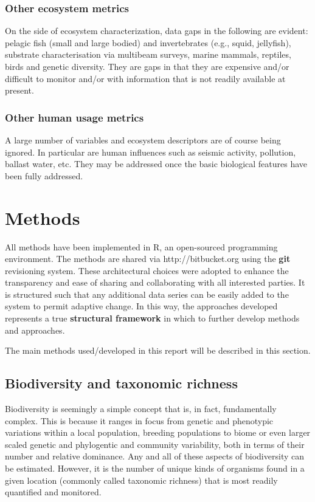 \documentclass[letterpaper,portrait,11pt]{scrartcl}
\numberwithin{equation}{section}    %
\numberwithin{figure}{section}    %
\numberwithin{table}{section}       %
\begin{document}
\subsubsection{Other ecosystem metrics}
On the side of ecosystem characterization, data gaps in the following are evident: pelagic fish (small and large bodied) and invertebrates (e.g., squid, jellyfish), substrate characterisation via multibeam surveys, marine mammals, reptiles, birds and genetic diversity. They are gaps in that they are expensive and/or difficult to monitor and/or with information that is not readily available at present.

\subsubsection{Other human usage metrics}
A large number of variables and ecosystem descriptors are of course being ignored. In particular are human influences such as seismic activity, pollution, ballast water, etc. They may be addressed once the basic biological features have been fully addressed. 


\afterpage{\clearpage}
\section{Methods}
\label{sec:methods}

All methods have been implemented in R, an open-sourced programming environment. The methods are shared via http://bitbucket.org using the \textbf{git} revisioning system. These architectural choices were adopted to enhance the transparency and ease of sharing and collaborating with all interested parties. It is structured such that any additional data series can be easily added to the system to permit adaptive change. In this way, the approaches developed represents a true \textbf{structural framework} in which to further develop methods and approaches. 

The main methods used/developed in this report will be described in this section.


\subsection{Biodiversity and taxonomic richness}


Biodiversity is seemingly a simple concept that is, in fact, fundamentally complex. This is because it ranges in focus from genetic and phenotypic variations within a local population, breeding populations to biome or even larger scaled genetic and phylogentic and community variability, both in terms of their number and relative dominance. Any and all of these aspects of biodiversity can be estimated. However, it is the number of unique kinds of organisms found in a given location (commonly called taxonomic richness) that is most readily quantified and monitored. 
\end{document}
